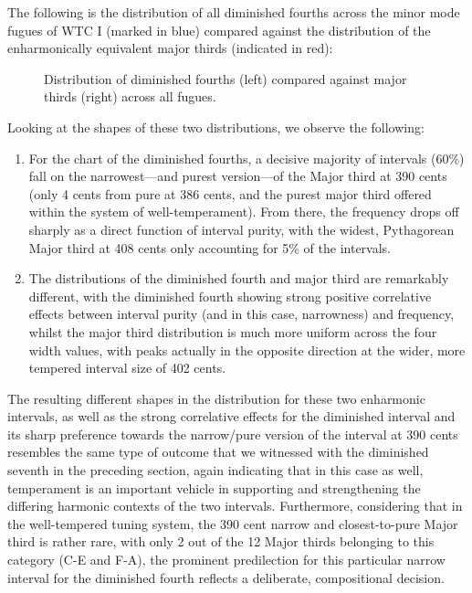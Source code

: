 The following is the distribution of all diminished fourths across the
minor mode fugues of WTC I (marked in blue) compared against the
distribution of the enharmonically equivalent major thirds (indicated in
red):



\begin{figure}[H]
\vspace{1.5em}
    \centering
    \caption[Distribution of diminished fourths compared against major thirds across all fugues. ]{Distribution of diminished fourths (left) compared against major thirds (right) across all fugues.}
\end{figure}    Looking at the shapes of these two distributions, we observe the
following:

\begin{enumerate}
\def\labelenumi{\arabic{enumi}.}
\tightlist
\item
  For the chart of the diminished fourths, a decisive majority of
  intervals (60\%) fall on the narrowest---and purest
  version---of the Major third at 390 cents (only 4 cents from pure
  at 386 cents, and the purest major third offered within the system of
  well-temperament). From there, the frequency drops off sharply as a
  direct function of interval purity, with the widest, Pythagorean Major
  third at 408 cents only accounting for 5\% of the intervals.
\item
  The distributions of the diminished fourth and major third are
  remarkably different, with the diminished fourth showing strong
  positive correlative effects between interval purity (and in this
  case, narrowness) and frequency, whilst the major third distribution
  is much more uniform across the four width values, with peaks actually
  in the opposite direction at the wider, more tempered interval size of
  402 cents.
\end{enumerate}

The resulting different shapes in the distribution for these two
enharmonic intervals, as well as the strong correlative effects for the
diminished interval and its sharp preference towards the narrow/pure
version of the interval at 390 cents resembles the same type of outcome
that we witnessed with the diminished seventh in the preceding section,
again indicating that in this case as well, temperament is an important
vehicle in supporting and strengthening the differing harmonic contexts
of the two intervals. Furthermore, considering that in the well-tempered
tuning system, the 390 cent narrow and closest-to-pure Major third is
rather rare, with only 2 out of the 12 Major thirds belonging to this
category (C-E and F-A), the prominent predilection for this particular
narrow interval for the diminished fourth reflects a deliberate,
compositional decision.

